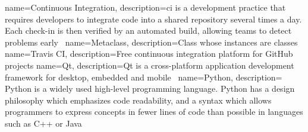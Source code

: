 {
    name={Continuous Integration},
    description={\acrlong{ci} is a development practice that requires developers
    to integrate code into a shared repository several times a day.  Each
check-in is then verified by an automated build, allowing teams to detect
problems early~\cite{thoughtworks2017}}
}
{
    name=Metaclass,
    description={Class whose instances are classes}
}
{
    name={Travis CI},
    description={Free continuous integration platform for GitHub projects}
}
{
    name=Qt,
    description={Qt is a cross-platform application development framework for
    desktop, embedded and mobile~\cite{aboutQt2017}}
}
{
    name=Python,
    description= {Python is a widely used high-level programming language. Python has a design philosophy which emphasizes code readability, and a syntax which allows programmers to express concepts in fewer lines of code than possible in languages such as C++ or Java}
}

